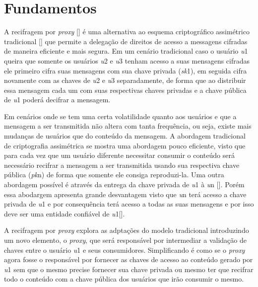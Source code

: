 \section{Fundamentos}
\label{recifragem:fundamentos}
A recifragem por \emph{proxy} [\cite{blaze1998divertible}] é uma alternativa ao esquema criptográfico assimétrico tradicional [\cite{1363std}] que permite a delegação de direitos de acesso a messagens cifradas de maneira eficiente e mais segura. Em um cenário tradicional caso o usuário \emph{u}1 queira que somente os usuários \emph{u}2 e \emph{u}3 tenham acesso a suas mensagens cifradas ele primeiro cifra suas mensagens com sua chave privada (\emph{sk}1), em seguida cifra novamente com as chaves de \emph{u}2 e \emph{u}3 separadamente, de forma que ao distribuir essa mensagem cada um com suas respectivas chaves privadas e a chave pública de \emph{u}1 poderá decifrar a mensagem.

Em cenários onde se tem uma certa volatilidade quanto aos usuários e que a mensagem a ser transmitida não altera com tanta frequência, ou seja, existe mais mudanças de usuários que do conteúdo da mensagem. A abordagem tradicional de criptografia assimétrica se mostra uma abordagem pouco eficiente, visto que para cada vez que um usuário diferente necessitar consumir o conteúdo será necessário recifrar a mensagem a ser transmitida usando sua respectiva chave pública (\emph{pk}n) de forma que somente ele consiga reproduzi-la. Uma outra abordagem possível é através da entrega da chave privada de \emph{u}1 à \emph{u}n [\cite{ma2009group}]. Porém essa abodargem apresenta grande desvantagem visto que \emph{u}n terá acesso a chave privada de \emph{u}1 e por consequência terá acesso a todas as suas mensagens e por isso deve ser uma entidade confiável de \emph{u}1[\cite{libert2011unidirectional}].

A recifragem por \emph{proxy} explora as adptações do modelo tradicional introduzindo um novo elemento, o \emph{proxy}, que será responsável por intermediar a validação de chaves entre o usuário \emph{u}1 e seus consumidores. Simplificando é como se o \emph{proxy} agora fosse o responsável por fornecer as chaves de acesso ao conteúdo gerado por \emph{u}1 sem que o mesmo precise fornecer sua chave privada ou mesmo ter que recifrar todo o conteúdo com a chave pública dos usuários que irão consumir o mesmo.

